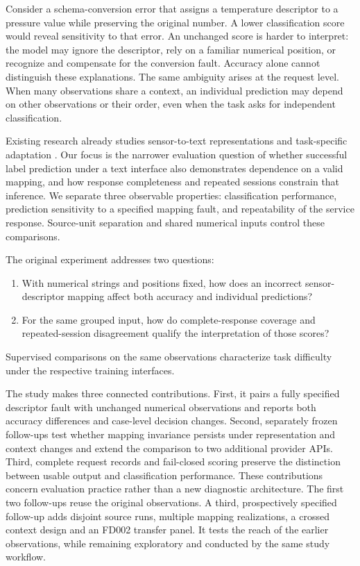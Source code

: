 \documentclass[11pt,a4paper]{article}
\begin{document}
Consider a schema-conversion error that assigns a temperature descriptor to a pressure value while preserving the original number. A lower classification score would reveal sensitivity to that error. An unchanged score is harder to interpret: the model may ignore the descriptor, rely on a familiar numerical position, or recognize and compensate for the conversion fault. Accuracy alone cannot distinguish these explanations. The same ambiguity arises at the request level. When many observations share a context, an individual prediction may depend on other observations or their order, even when the task asks for independent classification.

Existing research already studies sensor-to-text representations and task-specific adaptation \citep{qaid2026explainable,zheng2024empirical}. Our focus is the narrower evaluation question of whether successful label prediction under a text interface also demonstrates dependence on a valid mapping, and how response completeness and repeated sessions constrain that inference. We separate three observable properties: classification performance, prediction sensitivity to a specified mapping fault, and repeatability of the service response. Source-unit separation and shared numerical inputs control these comparisons.

The original experiment addresses two questions:
\begin{enumerate}
\item With numerical strings and positions fixed, how does an incorrect sensor-descriptor mapping affect both accuracy and individual predictions?
\item For the same grouped input, how do complete-response coverage and repeated-session disagreement qualify the interpretation of those scores?
\end{enumerate}
Supervised comparisons on the same observations characterize task difficulty under the respective training interfaces.

The study makes three connected contributions. First, it pairs a fully specified descriptor fault with unchanged numerical observations and reports both accuracy differences and case-level decision changes. Second, separately frozen follow-ups test whether mapping invariance persists under representation and context changes and extend the comparison to two additional provider APIs. Third, complete request records and fail-closed scoring preserve the distinction between usable output and classification performance. These contributions concern evaluation practice rather than a new diagnostic architecture. The first two follow-ups reuse the original observations. A third, prospectively specified follow-up adds disjoint source runs, multiple mapping realizations, a crossed context design and an FD002 transfer panel. It tests the reach of the earlier observations, while remaining exploratory and conducted by the same study workflow.
\end{document}
